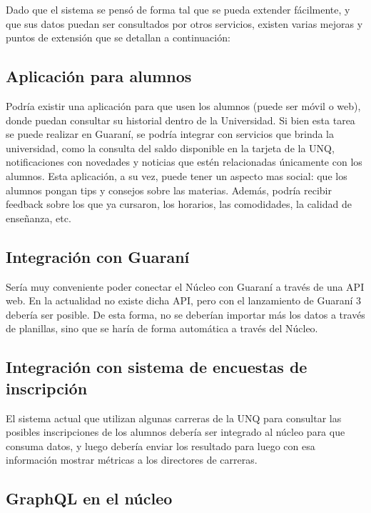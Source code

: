 Dado que el sistema se pensó de forma tal que se pueda extender fácilmente, y que sus datos puedan ser consultados por otros servicios, existen varias mejoras y puntos de extensión que se detallan a continuación:

\subsection[Aplicación para alumnos]{Aplicación para alumnos}

Podría existir una aplicación para que usen los alumnos (puede ser móvil o web), donde puedan consultar su historial dentro de la Universidad. Si bien esta tarea se puede realizar en Guaraní, se podría integrar con servicios que brinda la universidad, como la consulta del saldo disponible en la tarjeta de la UNQ, notificaciones con novedades y noticias que estén relacionadas únicamente con los alumnos.
Esta aplicación, a su vez, puede tener un aspecto mas social: que los alumnos pongan tips y consejos sobre las materias.
Además, podría recibir feedback sobre los que ya cursaron, los horarios, las comodidades, la calidad de enseñanza, etc.

\subsection[Integración con Guaraní]{Integración con Guaraní}

Sería muy conveniente poder conectar el Núcleo con Guaraní a través de una API web. En la actualidad no existe dicha API, pero con el lanzamiento de Guaraní 3 debería ser posible. De esta forma, no se deberían importar más los datos a través de planillas, sino que se haría de forma automática a través del Núcleo.

\subsection[Integración con sistema de encuestas de inscripción]{Integración con sistema de encuestas de inscripción}

El sistema actual que utilizan algunas carreras de la UNQ para consultar las posibles inscripciones de los alumnos debería ser integrado al núcleo para que consuma datos, y luego debería enviar los resultado para luego con esa información mostrar métricas a los directores de carreras. 


\subsection[GraphQL en el núcleo]{GraphQL en el núcleo}

